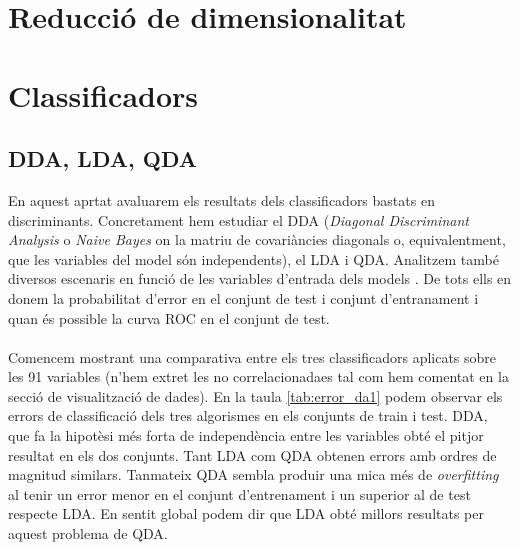\documentclass[a4paper,10pt]{article}
\begin{document}


\section{Reducció de dimensionalitat}

\section{Classificadors}
\subsection{DDA, LDA, QDA}
En aquest aprtat avaluarem els resultats dels classificadors bastats en discriminants. Concretament hem estudiar el DDA (\textit{Diagonal Discriminant Analysis} o  \textit{Naive Bayes} on la matriu de covariàncies diagonals o, equivalentment, que les variables del model són independents), el LDA i QDA. Analitzem també diversos escenaris en funció de les variables d'entrada dels models . De tots ells en donem la probabilitat d'error en el conjunt de test i conjunt d'entranament i quan és possible la curva ROC en el conjunt de test.
\\
\\
Comencem mostrant una comparativa entre els tres classificadors aplicats sobre les 91 variables (n'hem extret les no correlacionadaes tal com hem comentat en la secció de visualització de dades). En la taula \ref{tab:error_da1} podem observar els errors de classificació dels tres algorismes en els conjunts de train i test. DDA, que fa la hipotèsi més forta de independència entre les variables obté el pitjor resultat en els dos conjunts. Tant LDA com QDA obtenen errors amb ordres de magnitud similars. Tanmateix QDA sembla produir una mica més de \textit{overfitting} al tenir un error menor en el conjunt d'entrenament i un superior al de test respecte LDA. En sentit global podem dir que LDA obté millors resultats per aquest problema de QDA. 
\end{document}
